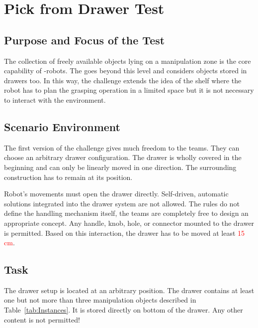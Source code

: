 \newpage
\section{Pick from Drawer Test}




\subsection{Purpose and Focus of the Test}
The collection of freely available objects lying on a manipulation zone is the core capability of \RCAW-robots. The  goes beyond this level and considers objects stored in drawers too. In this way, the challenge
extends the idea of the shelf where the robot has to plan the grasping operation in a limited space but it is not necessary to interact with the environment.

\subsection{Scenario Environment}
The first version of the challenge gives much freedom to the teams. They can choose an arbitrary drawer configuration. The drawer is wholly covered in the beginning and can only be linearly moved in one direction. The surrounding construction has to remain at its position.

\par
Robot's movements must open the drawer directly. Self-driven, automatic solutions integrated into the drawer system are not allowed.
The rules do not define the handling mechanism itself, the teams are completely free to design an appropriate concept. Any handle, knob, hole, or connector mounted to the drawer is permitted. Based on this interaction, the drawer has to be moved at least \textcolor{red}{15 cm}.

\subsection{Task}
The drawer setup is located at an arbitrary position. The drawer contains at least one but not more than three  manipulation objects described in Table~\ref{tab:Instances}. It is stored directly on bottom of the drawer. Any other content is not permitted!


